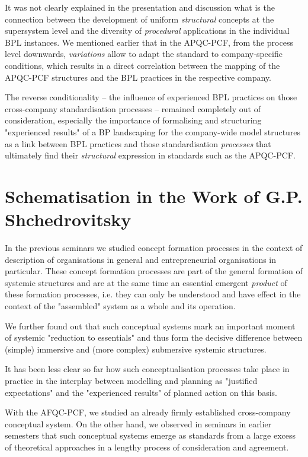 \documentclass[11pt,a4paper]{article}
\begin{document}
It was not clearly explained in the presentation and discussion what is the
connection between the development of uniform \emph{structural} concepts at
the supersystem level and the diversity of \emph{procedural} applications in
the individual BPL instances. We mentioned earlier that in the APQC-PCF, from
the process level downwards, \emph{variations} allow to adapt the standard to
company-specific conditions, which results in a direct correlation between the
mapping of the APQC-PCF structures and the BPL practices in the respective
company.

The reverse conditionality -- the influence of experienced BPL practices on
those cross-company standardisation processes -- remained completely out of
consideration, especially the importance of formalising and structuring
"experienced results" of a BP landscaping for the company-wide model
structures as a link between BPL practices and those standardisation
\emph{processes} that ultimately find their \emph{structural} expression in
standards such as the APQC-PCF.

\section{Schematisation in the Work of G.P. Shchedrovitsky}

In the previous seminars we studied concept formation processes in the context
of description of organisations in general and entrepreneurial organisations
in particular. These concept formation processes are part of the general
formation of systemic structures and are at the same time an essential
emergent \emph{product} of these formation processes, i.e. they can only be
understood and have effect in the context of the "assembled" system as a whole
and its operation.

We further found out that such conceptual systems mark an important moment of
systemic "reduction to essentials" and thus form the decisive difference
between (simple) immersive and (more complex) submersive systemic structures.

It has been less clear so far how such conceptualisation processes take place
in practice in the interplay between modelling and planning as "justified
expectations" and the "experienced results" of planned action on this basis.

With the AFQC-PCF, we studied an already firmly established cross-company
conceptual system. On the other hand, we observed in seminars in earlier
semesters that such conceptual systems emerge as standards from a large excess
of theoretical approaches in a lengthy process of consideration and agreement.
\end{document}
